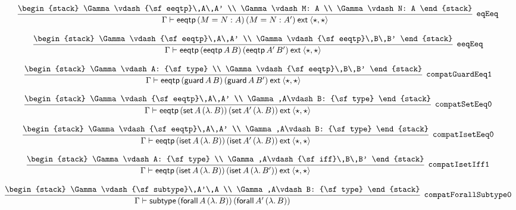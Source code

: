 \[
\infer[{\tt eqEeq}]{\Gamma \vdash {\sf eeqtp}\,(M= N: A)\,(M= N: A')\:{\sf ext}\:\langle \star ,\star \rangle }{
\begin{stack}
\Gamma \vdash {\sf eeqtp}\,A\,A'
\\
\Gamma \vdash M: A
\\
\Gamma \vdash N: A
\end{stack}}
\]

\[
\infer[{\tt eeqEeq}]{\Gamma \vdash {\sf eeqtp}\,({\sf eeqtp}\,A\,B)\,({\sf eeqtp}\,A'\,B')\:{\sf ext}\:\langle \star ,\star \rangle }{
\begin{stack}
\Gamma \vdash {\sf eeqtp}\,A\,A'
\\
\Gamma \vdash {\sf eeqtp}\,B\,B'
\end{stack}}
\]

\[
\infer[{\tt compatGuardEeq1}]{\Gamma \vdash {\sf eeqtp}\,({\sf guard}\,A\,B)\,({\sf guard}\,A\,B')\:{\sf ext}\:\langle \star ,\star \rangle }{
\begin{stack}
\Gamma \vdash A: {\sf type}
\\
\Gamma \vdash {\sf eeqtp}\,B\,B'
\end{stack}}
\]

\[
\infer[{\tt compatSetEeq0}]{\Gamma \vdash {\sf eeqtp}\,({\sf set}\,A\,(\lambda .\,B))\,({\sf set}\,A'\,(\lambda .\,B))\:{\sf ext}\:\langle \star ,\star \rangle }{
\begin{stack}
\Gamma \vdash {\sf eeqtp}\,A\,A'
\\
\Gamma ,A\vdash B: {\sf type}
\end{stack}}
\]

\[
\infer[{\tt compatIsetEeq0}]{\Gamma \vdash {\sf eeqtp}\,({\sf iset}\,A\,(\lambda .\,B))\,({\sf iset}\,A'\,(\lambda .\,B))\:{\sf ext}\:\langle \star ,\star \rangle }{
\begin{stack}
\Gamma \vdash {\sf eeqtp}\,A\,A'
\\
\Gamma ,A\vdash B: {\sf type}
\end{stack}}
\]

\[
\infer[{\tt compatIsetIff1}]{\Gamma \vdash {\sf eeqtp}\,({\sf iset}\,A\,(\lambda .\,B))\,({\sf iset}\,A\,(\lambda .\,B'))\:{\sf ext}\:\langle \star ,\star \rangle }{
\begin{stack}
\Gamma \vdash A: {\sf type}
\\
\Gamma ,A\vdash {\sf iff}\,B\,B'
\end{stack}}
\]

\[
\infer[{\tt compatForallSubtype0}]{\Gamma \vdash {\sf subtype}\,({\sf forall}\,A\,(\lambda .\,B))\,({\sf forall}\,A'\,(\lambda .\,B))}{
\begin{stack}
\Gamma \vdash {\sf subtype}\,A'\,A
\\
\Gamma ,A\vdash B: {\sf type}
\end{stack}}
\]

